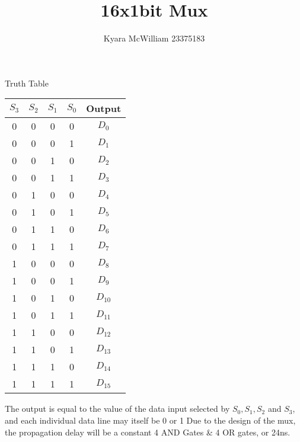 \documentclass{article}
\title{16x1bit Mux}
\author{Kyara McWilliam 23375183}
\date{}
\begin{document}
\maketitle

Truth Table

\begin{tabular}{ |c|c|c|c|c| }
\hline
$S_3$ & $S_2$ & $S_1$ & $S_0$ & Output \\
\hline
0 & 0 & 0 & 0 & $D_0$ \\
0 & 0 & 0 & 1 & $D_1$ \\
0 & 0 & 1 & 0 & $D_2$ \\
0 & 0 & 1 & 1 & $D_3$ \\
0 & 1 & 0 & 0 & $D_4$ \\
0 & 1 & 0 & 1 & $D_5$ \\
0 & 1 & 1 & 0 & $D_6$ \\
0 & 1 & 1 & 1 & $D_7$ \\
1 & 0 & 0 & 0 & $D_8$ \\
1 & 0 & 0 & 1 & $D_9$ \\
1 & 0 & 1 & 0 & $D_{10}$ \\
1 & 0 & 1 & 1 & $D_{11}$ \\
1 & 1 & 0 & 0 & $D_{12}$ \\
1 & 1 & 0 & 1 & $D_{13}$ \\
1 & 1 & 1 & 0 & $D_{14}$ \\
1 & 1 & 1 & 1 & $D_{15}$ \\
\hline
\end{tabular}
\hfill \break

The output is equal to the value of the data input selected by $S_0, S_1, S_2$ and $S_3$, and each individual data line may itself be 0 or 1 \newline
Due to the design of the mux, the propagation delay will be a constant 4 AND Gates \& 4 OR gates, or 24ns.
\end{document}
